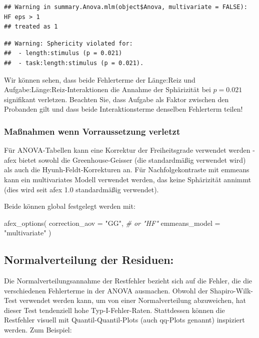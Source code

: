 \documentclass[
]{book}
\newenvironment{Shaded}{\begin{snugshade}}{\end{snugshade}}
\newcommand{\AttributeTok}[1]{\textcolor[rgb]{0.77,0.63,0.00}{#1}}
\newcommand{\CommentTok}[1]{\textcolor[rgb]{0.56,0.35,0.01}{\textit{#1}}}
\newcommand{\FunctionTok}[1]{\textcolor[rgb]{0.00,0.00,0.00}{#1}}
\newcommand{\NormalTok}[1]{#1}
\newcommand{\StringTok}[1]{\textcolor[rgb]{0.31,0.60,0.02}{#1}}
\begin{document}
\begin{verbatim}
## Warning in summary.Anova.mlm(object$Anova, multivariate = FALSE): HF eps > 1
## treated as 1
\end{verbatim}

\begin{verbatim}
## Warning: Sphericity violated for: 
##  - length:stimulus (p = 0.021)
##  - task:length:stimulus (p = 0.021).
\end{verbatim}

Wir können sehen, dass beide Fehlerterme der Länge:Reiz und Aufgabe:Länge:Reiz-Interaktionen die Annahme der Sphärizität bei \(p = 0.021\) signifikant verletzen. Beachten Sie, dass Aufgabe als Faktor zwischen den Probanden gilt und dass beide Interaktionsterme denselben Fehlerterm teilen!

\hypertarget{mauxdfnahmen-wenn-vorraussetzung-verletzt-1}{%
\subsubsection{Maßnahmen wenn Vorraussetzung verletzt}\label{mauxdfnahmen-wenn-vorraussetzung-verletzt-1}}

Für ANOVA-Tabellen kann eine Korrektur der Freiheitsgrade verwendet werden - afex bietet sowohl die Greenhouse-Geisser (die standardmäßig verwendet wird) als auch die Hyunh-Feldt-Korrekturen an.
Für Nachfolgekontraste mit emmeans kann ein multivariates Modell verwendet werden, das keine Sphärizität annimmt (dies wird seit afex 1.0 standardmäßig verwendet).

Beide können global festgelegt werden mit:

\begin{Shaded}
\begin{Highlighting}[]
\FunctionTok{afex\_options}\NormalTok{(}
  \AttributeTok{correction\_aov =} \StringTok{"GG"}\NormalTok{, }\CommentTok{\# or "HF"}
  \AttributeTok{emmeans\_model =} \StringTok{"multivariate"}
\NormalTok{)}
\end{Highlighting}
\end{Shaded}

\hypertarget{normalverteilung-der-residuen}{%
\subsection{Normalverteilung der Residuen:}\label{normalverteilung-der-residuen}}

Die Normalverteilungsannahme der Restfehler bezieht sich auf die Fehler, die die verschiedenen Fehlerterme in der ANOVA ausmachen. Obwohl der Shapiro-Wilk-Test verwendet werden kann, um von einer Normalverteilung abzuweichen, hat dieser Test tendenziell hohe Typ-I-Fehler-Raten. Stattdessen können die Restfehler visuell mit Quantil-Quantil-Plots (auch qq-Plots genannt) inspiziert werden. Zum Beispiel:
\end{document}
